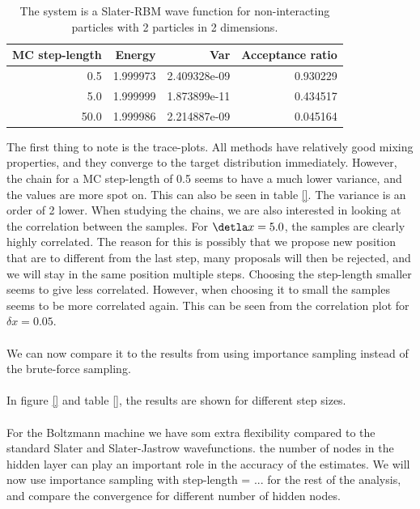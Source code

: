 \begin{table}[h!]
    \centering
    \begin{tabular}{rrrr}
     MC step-length &    Energy &           Var &  Acceptance ratio \\ \hline
                0.5 &  1.999973 &  2.409328e-09 &          0.930229 \\
                5.0 &  1.999999 &  1.873899e-11 &          0.434517 \\
               50.0 &  1.999986 &  2.214887e-09 &          0.045164 \\
    \end{tabular}
    \caption{The system is a Slater-RBM wave function for non-interacting particles with 2 particles in 2 dimensions.}
    \label{tab:rbm_mcmc_diagnostic}
\end{table}
The first thing to note is the trace-plots. All methods have relatively good mixing properties, and they converge to the target distribution immediately. However, the chain for a MC step-length of 0.5 seems to have a much lower variance, and the values are more spot on. This can also be seen in table \ref{}. The variance is an order of 2 lower. When studying the chains, we are also interested in looking at the correlation between the samples. For $\detla x = 5.0$, the samples are clearly highly correlated. The reason for this is possibly that we propose new position that are to different from the last step, many proposals will then be rejected, and we will stay in the same position multiple steps. Choosing the step-length smaller seems to give less correlated. However, when choosing it to small the samples seems to be more correlated again. This can be seen from the correlation plot for $\delta x = 0.05$. 
\\
\\
We can now compare it to the results from using importance sampling instead of the brute-force sampling. 
\\
\\
In figure \ref{} and table \ref{}, the results are shown for different step sizes. 
\\
\\
For the Boltzmann machine we have som extra flexibility compared to the standard Slater and Slater-Jastrow wavefunctions. the number of nodes in the hidden layer can play an important role in the accuracy of the estimates. We will now use importance sampling with step-length = ... for the rest of the analysis, and compare the convergence for different number of hidden nodes.  

